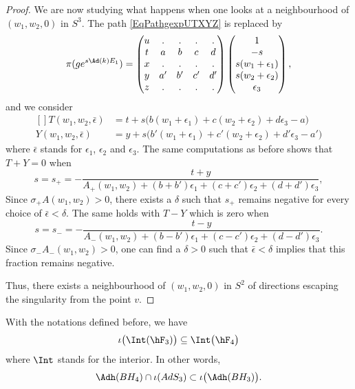 \begin{proof}
We are now studying what happens when one looks at a neighbourhood of $(w_1,w_2,0)$ in $S^3$. The path \eqref{EqPathgexpUTXYZ} is replaced by
\begin{equation}
	\pi(g e^{s\Ad(k)E_1})= 
	\begin{pmatrix}
 u	&	.	&	.	&	.	&	.\\ 
 t	&	a	&	b	&	c	&	d\\ 
 x	&	.	&	.	&	.	&	.\\ 
 y	&	a'	&	b'	&	c'	&	d'\\ 
z	&	.	&	.	&	.	&	. 
 \end{pmatrix}
\begin{pmatrix}
	1	\\ 
	-s	\\ 
	s(w_1+\epsilon_1)	\\ 
	s(w_2+\epsilon_2)	\\ 
	\epsilon_3	
\end{pmatrix},
\end{equation}
and we consider
\begin{equation}
	\begin{aligned}[]
		T(w_1,w_2,\bar\epsilon)&=t+s\big( b(w_1+\epsilon_1)+c(w_2+\epsilon_2)+d\epsilon_3-a \big)\\
		Y(w_1,w_2,\bar\epsilon)&=y+s\big( b'(w_1+\epsilon_1)+c'(w_2+\epsilon_2)+d'\epsilon_3-a' \big)
	\end{aligned}
\end{equation}
where $\bar\epsilon$ stands for $\epsilon_1$, $\epsilon_2$ and $\epsilon_3$. The same computations as before shows that $T+Y=0$ when
\begin{equation}
	s=s_+=-\frac{ t+y }{ A_+(w_1,w_2)+(b+b')\epsilon_1+(c+c')\epsilon_2+(d+d')\epsilon_3 },
\end{equation}
Since $\sigma_+A(w_1,w_2)>0$, there exists a $\delta$ such that $s_+$ remains negative for every choice of $\bar\epsilon<\delta$. The same holds with $T-Y$ which is zero when
\begin{equation}
	s=s_-=-\frac{ t-y }{ A_-(w_1,w_2)+(b-b')\epsilon_1+(c-c')\epsilon_2 +(d-d')\epsilon_3 }.
\end{equation}
Since $\sigma_-A_-(w_1,w_2)>0$, one can find a $\delta>0$ such that $\bar\epsilon<\delta$ implies that this fraction remains negative.

Thus, there exists a neighbourhood of $(w_1,w_2,0)$ in $S^2$ of directions escaping the singularity from the point $v$.
\end{proof}

\begin{lemma}		\label{LemIntTroisQueatr}
	With the notations defined before, we have
	\begin{equation}
		\iota\big( \Int(\hF_3) \big)\subseteq \Int\big( \hF_4 \big)
	\end{equation}
	where $\Int$ stands for the interior. In other words,
	\begin{equation}
		\Adh(BH_4)\cap\iota(AdS_3)\subset\iota\big( \Adh(BH_3) \big).
	\end{equation}
\end{lemma}

